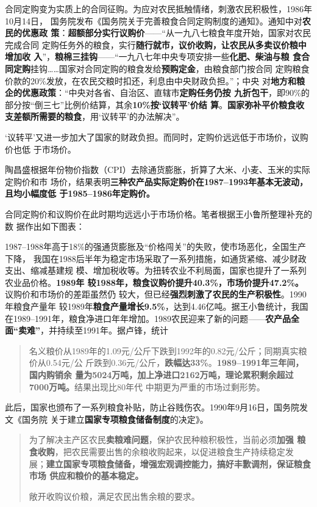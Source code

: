 合同定购变为实质上的合同征购。为应对农民抵触情绪，刺激农民积极性，1986年10月14日，
国务院发布《国务院关于完善粮食合同定购制度的通知》。通知中对\textbf{农民的优惠政
  策}：\textbf{超额部分实行议购价}——“从一九八七粮食年度开始，国家对农民完成合同
定购任务外的粮食，实行\textbf{随行就市，议价收购，让农民从多卖议价粮中增加收
  入}”，\textbf{粮棉三挂钩}——“一九八七年中央专项安排一些\textbf{化肥、柴油与粮
  食合同定购}挂钩……国家对合同定购的粮食发给\textbf{预购定金}，由粮食部门按合同
定购粮食价款的20\%发放，在农民交粮时扣还，利息由中央财政负担。”；中央
对\textbf{地方和粮企的优惠政策}：“中央对各省、自治区、直辖市\textbf{定购任务仍按
  九折包干}，即90\%的部分按“倒三七”比例价结算，其余\textbf{10\%按‘议转平’价结
  算}。\textbf{国家弥补平价粮食收支差额所需要的粮食}，用‘议转平’的办法解决”。

‘议转平’又进一步加大了国家的财政负担。而同时，定购价远远低于市场价，议购价也低
于市场价。

陶昌盛根据年份物价指数（CPI）去除通货膨胀，折算了大米、小麦、玉米的实际定购价和市
场价，结果表明\textbf{三种农产品实际定购价在1987--1993年基本无波动，且均小幅度低
  于1985--1986年定购价。}\cite{taochangsheng}

合同定购价和议购价在此时期均远远小于市场价格。笔者根据王小鲁所整理补充的数
据\cite{wangxiaoluliangshi}作出如下图表：




1987--1988年高于18\%的强通货膨胀及“价格闯关”的失败，使市场恶化，全国生产下降，
我国在1988后半年为稳定市场采取了一系列措施，如通货紧缩、减少财政支出、缩减基建规
模、增加税收等。为扭转农业不利局面，国家也提升了一系列农业品价格。\textbf{1989年
  较1988年，粮食议购价提升40.3\%，市场价提升47.2\%。} 议购价和市场价的差距虽然仍
较大，但已经\textbf{强烈刺激了农民的生产积极性}。1990年粮食产量年
较1989年\textbf{粮食产量增长9.5\%}，达到4.46亿吨。据王小鲁统计，我国
在1989--1991年，粮食净进口年年增加。1989农民迎来了新的问题——\textbf{农产品全
  面“卖难”}，并持续至1991年。据卢锋，统计
\begin{quotation}
  名义粮价从1989年的1.09元/公斤下跌到1992年的0.82元/公斤；同期真实粮价从0.54元/公
  斤跌到0.36元/公斤，\textbf{跌幅达33\%}。\textbf{1989--1991年三年间，国内购销余
    量为5024万吨，加上净进口2162万吨，理论累积剩余超过7000万吨。}结果出现比80年代
  中期更为严重的市场过剩形势。
\end{quotation}

此后，国家也颁布了一系列粮食补贴，防止谷贱伤农。1990年9月16日，国务院发文《国务院
关于建立\textbf{国家专项粮食储备制度}的决定》。
\begin{quotation}
  为了解决主产区农民\textbf{卖粮难问题}，保护农民种粮积极性，当前必须\textbf{加强
    粮食收购}，把农民需要出售的余粮收购起来，以促进粮食生产持续稳定发
  展；\textbf{建立国家专项粮食储备，增强宏观调控能力，搞好丰歉调剂，保证粮食市场
  供应和粮价的基本稳定。}

敞开收购议价粮，满足农民出售余粮的要求。
\end{quotation}

